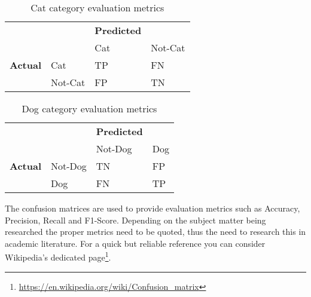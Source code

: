 \begin{table}
    \caption{Cat category evaluation metrics}
    \label{tab:CatObjective}
    \centering
    \begin{tabular}{ll|ll}
    ~      & ~   & \textbf{Predicted} & ~   \\
    ~      & ~   & Cat       & Not-Cat \\ \hline
    \textbf{Actual} & Cat & TP        & FN   \\
    ~      & Not-Cat & FP         & TN  \\
    \end{tabular}
\end{table}

\begin{table}
    \caption{Dog category evaluation metrics}
    \label{tab:DogObjective}
    \centering
    \begin{tabular}{ll|ll}
    ~      & ~   & \textbf{Predicted} & ~   \\
    ~      & ~   & Not-Dog       & Dog \\ \hline
    \textbf{Actual} & Not-Dog & TN        & FP   \\
    ~      & Dog & FN         & TP  \\
    \end{tabular}
\end{table}

\par The confusion matrices are used to provide evaluation metrics such as Accuracy, Precision, Recall and F1-Score. Depending on the subject matter being researched the proper metrics need to be quoted, thus the need to research this in academic literature. For a quick but reliable reference you can consider Wikipedia's dedicated page\footnote{\url{https://en.wikipedia.org/wiki/Confusion_matrix}}.

